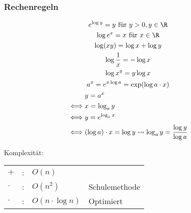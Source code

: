 \subsubsection{Rechenregeln}
\begin{gather*}
	e^{\log y} = y \text{ für } y > 0 , y \in \R \\
	\log e^x = x \text{ für } x \in \R \\
	\log (xy) = \log x + \log y \\
	\log \frac{1}{x} = - \log x \\
	\log x^y = y \log x \\
	a^x = e^{x \log a} = \exp(\log a \cdot x) \\
	\begin{split}
			&y = a^x \\
		\iff	&x = \log_a y \\
		\iff	&y = e^{\log_a x} \\
		\iff	&(\log a) \cdot x = \log y \rightsquigarrow \log_a y = \frac{\log y}{\log a}
	\end{split}
\end{gather*}

Komplexität:
\begin{tabular}{ l c l l }
	$+$		&:	&$O(n)$			&			\\
	$\cdot$	&:	&$O(n^2)$			&Schulemethode	\\
	$\cdot$	&:	&$O(n \cdot \log n)$	&Optimiert		
\end{tabular}

